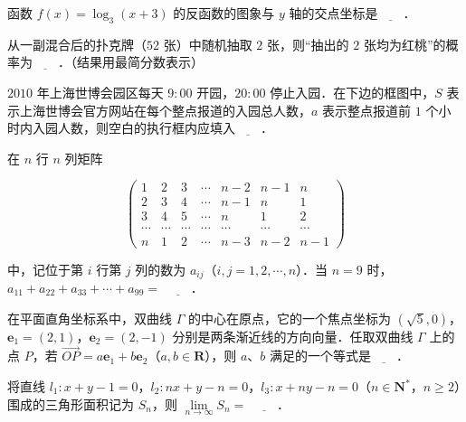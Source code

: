 \begin{question}
函数 $f(x)=\log_3(x+3)$ 的反函数的图象与 $y$ 轴的交点坐标是$\underline{\qquad}$．

\end{question}
\begin{question}
从一副混合后的扑克牌（$52$ 张）中随机抽取 $2$ 张，则“抽出的 $2$ 张均为红桃”的概率为$\underline{\qquad}$．（结果用最简分数表示）

\Needspace{0.4\textheight}
\end{question}
\begingroup
\renewenvironment{question}{\Needspace{0.5\textheight}}{}
\begin{question}
$2010$ 年上海世博会园区每天 $9:00$ 开园，$20:00$ 停止入园．在下边的框图中，$S$ 表示上海世博会官方网站在每个整点报道的入园总人数，$a$ 表示整点报道前 $1$ 个小时内入园人数，则空白的执行框内应填入$\underline{\qquad}$．
\nopagebreak[4]
\begin{center}\end{center}
\nopagebreak[4]
\end{question}
\endgroup
\begin{question}
在 $n$ 行 $n$ 列矩阵

\nopagebreak[4]
\[\begin{pmatrix}
1&2&3&\cdots&n-2&n-1&n\\
2&3&4&\cdots&n-1&n&1\\
3&4&5&\cdots&n&1&2\\
\cdots&\cdots&\cdots&\cdots&\cdots&\cdots&\cdots\\
n&1&2&\cdots&n-3&n-2&n-1
\end{pmatrix}\]

中，记位于第 $i$ 行第 $j$ 列的数为 $a_{ij}$（$i,j=1,2,\cdots,n$）．当 $n=9$ 时，$a_{11}+a_{22}+a_{33}+\cdots+a_{99}=$ $\underline{\qquad}$．

\end{question}
\begin{question}
在平面直角坐标系中，双曲线 $\Gamma$ 的中心在原点，它的一个焦点坐标为 $(\sqrt5,0)$，$\boldsymbol e_1=(2,1)$，$\boldsymbol e_2=(2,-1)$ 分别是两条渐近线的方向向量．任取双曲线 $\Gamma$ 上的点 $P$，若 $\overrightarrow{OP}=a\boldsymbol e_1+b\boldsymbol e_2$（$a,b\in\mathbf R$），则 $a$、$b$ 满足的一个等式是$\underline{\qquad}$．

\end{question}
\begin{question}
将直线 $l_1:x+y-1=0$，$l_2:nx+y-n=0$，$l_3:x+ny-n=0$（$n\in\mathbf N^*$，$n\geqslant2$）围成的三角形面积记为 $S_n$，则 $\lim\limits_{n\to\infty}S_n=$ $\underline{\qquad}$．

\end{question}

